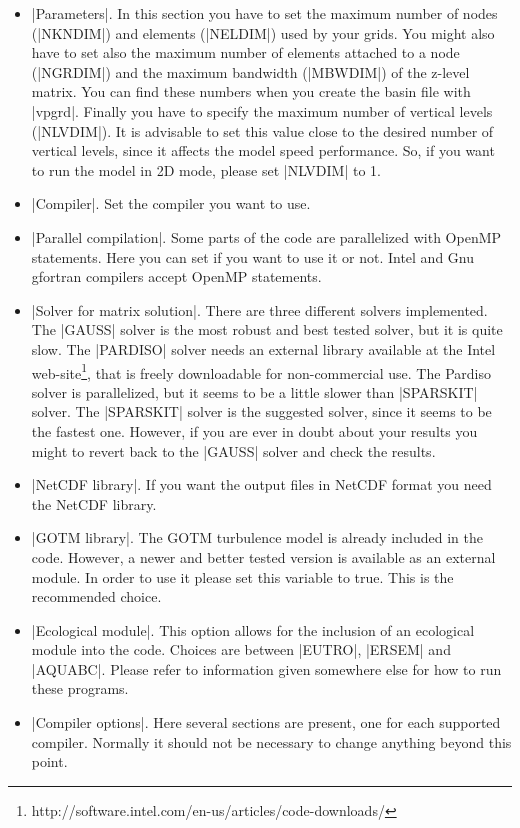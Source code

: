\begin{itemize}
\item |Parameters|. In this section you have to set the
maximum number of nodes (|NKNDIM|) and elements (|NELDIM|)
used by your grids. You might also have to set also the maximum number 
of elements attached to
a node (|NGRDIM|) and the maximum bandwidth (|MBWDIM|) of the
z-level matrix. You can find these numbers when you create the basin file
with |vpgrd|. Finally you have to specify
the maximum number of vertical levels (|NLVDIM|).
It is advisable to set this value close to the desired number of
vertical levels, since it affects the model speed performance. So, if
you want to run the model in 2D mode, please set |NLVDIM| to 1.
\item |Compiler|. Set the compiler you want to use.
\item |Parallel compilation|. Some parts of the code are parallelized
with OpenMP statements. Here you can set if you want to use it or not.
Intel and Gnu gfortran compilers accept OpenMP statements.
\item |Solver for matrix solution|. There are three different solvers
implemented. 
The |GAUSS| solver is the most robust and best tested solver,
but it is quite slow. The |PARDISO| solver needs an
external library available at the Intel 
web-site\footnote{http://software.intel.com/en-us/articles/code-downloads/},
that is freely downloadable for non-commercial use. 
The Pardiso solver is parallelized,
but it seems to be a little slower than |SPARSKIT| solver.
The |SPARSKIT| solver is the suggested solver, since it seems to be the 
fastest one. However, if you are ever in doubt about your results you might
to revert back to the |GAUSS| solver and check the results.
\item |NetCDF library|. If you want the output files in NetCDF format
you need the NetCDF library.
\item |GOTM library|. The GOTM turbulence model is already included
in the code. However, a newer and better tested version is available as
an external module. In order to use it please set this variable
to true. This is the recommended choice.
\item |Ecological module|. This option allows for the inclusion
of an ecological module into the code. Choices are between
|EUTRO|, |ERSEM| and |AQUABC|. Please refer to information given 
somewhere else for how to run these programs.
\item |Compiler options|. Here several sections are present, 
one for each supported compiler. Normally it should not be necessary to 
change anything beyond this point.
\end{itemize}

